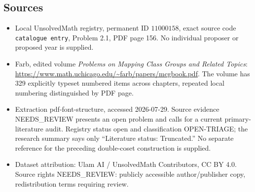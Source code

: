 \documentclass[11pt]{article}
\begin{document}
\subsection{Sources}
\begin{itemize}
\item Local UnsolvedMath registry, permanent ID \(11000158\), exact source code \texttt{catalogue entry}, Problem 2.1, PDF page 156. No individual proposer or proposed year is supplied.
\item Farb, edited volume \emph{Problems on Mapping Class Groups and Related Topics}: \url{https://www.math.uchicago.edu/~farb/papers/mcgbook.pdf}. The volume has 329 explicitly typeset numbered items across chapters, repeated local numbering distinguished by PDF page.
\item Extraction pdf-font-structure, accessed 2026-07-29. Source evidence NEEDS\_REVIEW presents an open problem and calls for a current primary-literature audit. Registry status open and classification OPEN-TRIAGE; the research summary says only ``Literature status: Truncated.'' No separate reference for the preceding double-coset construction is supplied.
\item Dataset attribution: Ulam AI / UnsolvedMath Contributors, CC BY 4.0. Source rights NEEDS\_REVIEW: publicly accessible author/publisher copy, redistribution terms requiring review.
\end{itemize}
\end{document}
